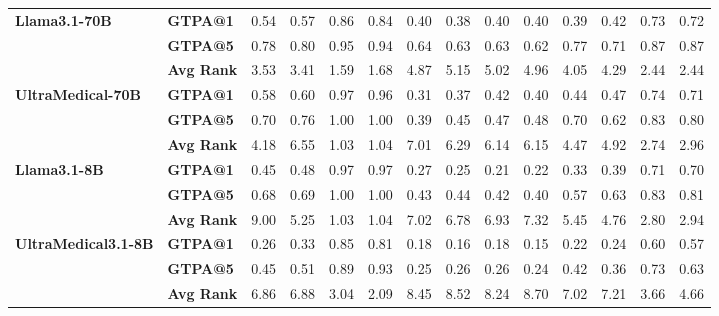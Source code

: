 \begin{table*}[h]
\begin{tabular}{l l cccc cccc cccc}
    \multirow{3}{*}{\textbf{Llama3.1-70B}} 
    & \textbf{GTPA@1} & 0.54 & 0.57 & 0.86 & 0.84 & 0.40 & 0.38 & 0.40 & 0.40 & 0.39 & 0.42 & 0.73 & 0.72 \\
    & \textbf{GTPA@5} & 0.78 & 0.80 & 0.95 & 0.94 & 0.64 & 0.63 & 0.63 & 0.62 & 0.77 & 0.71 & 0.87 & 0.87 \\
    & \textbf{Avg Rank} & 3.53 & 3.41 & 1.59 & 1.68 & 4.87 & 5.15 & 5.02 & 4.96 & 4.05 & 4.29 & 2.44 & 2.44 \\
     \midrule
    \multirow{3}{*}{\textbf{UltraMedical-70B}}  
    & \textbf{GTPA@1} & 0.58 & 0.60& 0.97 & 0.96 & 0.31 & 0.37 & 0.42 & 0.40& 0.44 & 0.47 & 0.74 & 0.71 \\
    & \textbf{GTPA@5} & 0.70 & 0.76 & 1.00& 1.00& 0.39 & 0.45 & 0.47 & 0.48 & 0.70& 0.62 & 0.83 & 0.80\\
    & \textbf{Avg Rank} & 4.18 & 6.55 & 1.03 & 1.04 & 7.01 & 6.29 & 6.14 & 6.15 & 4.47 & 4.92 & 2.74 & 2.96 \\
    \midrule
    \multirow{3}{*}{\textbf{Llama3.1-8B}}
    & \textbf{GTPA@1} & 0.45 & 0.48 & 0.97 & 0.97 & 0.27 & 0.25 & 0.21 & 0.22 & 0.33 & 0.39 & 0.71 & 0.70\\
    & \textbf{GTPA@5} & 0.68 & 0.69 & 1.00& 1.00& 0.43 & 0.44 & 0.42 & 0.40& 0.57 & 0.63 & 0.83 & 0.81 \\
    & \textbf{Avg Rank} & 9.00 & 5.25 & 1.03 & 1.04 & 7.02 & 6.78 & 6.93 & 7.32 & 5.45 & 4.76 & 2.80& 2.94 \\
    \midrule
    \multirow{3}{*}{\textbf{UltraMedical3.1-8B}} 
    & \textbf{GTPA@1} & 0.26 & 0.33 & 0.85 & 0.81 & 0.18 & 0.16 & 0.18 & 0.15 & 0.22 & 0.24 & 0.60& 0.57 \\
    & \textbf{GTPA@5} & 0.45 & 0.51 & 0.89 & 0.93 & 0.25 & 0.26 & 0.26 & 0.24 & 0.42 & 0.36 & 0.73 & 0.63 \\
    & \textbf{Avg Rank} & 6.86 & 6.88 & 3.04 & 2.09 & 8.45 & 8.52 & 8.24 & 8.70& 7.02 & 7.21 & 3.66 & 4.66 \\
    

\end{tabular}
\end{table*}
